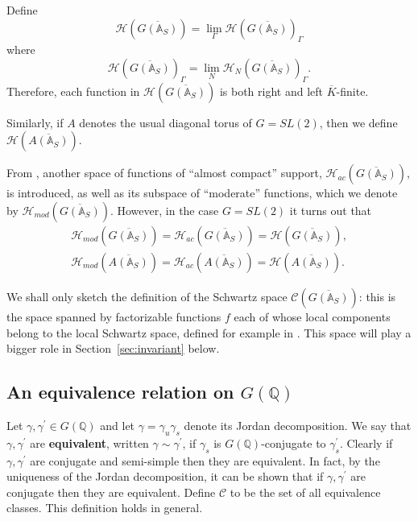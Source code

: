 Define
\[
{\mathcal{H}}(\overline{G({\mathbb{A}}_S)})=\lim_{\Gamma}
{\mathcal{H}}(\overline{G({\mathbb{A}}_S)})_\Gamma
\]
where
\[
{\mathcal{H}}(\overline{G({\mathbb{A}}_S)})_\Gamma =\lim_{N}
{\mathcal{H}}_N(\overline{G({\mathbb{A}}_S)})_\Gamma .
\]
Therefore, each function in
${\mathcal{H}}(\overline{G({\mathbb{A}}_S)})$
is both right and left $\overline{K}$-finite.

Similarly, if $A$ denotes the usual
diagonal torus of $G=SL(2)$, then we define
${\mathcal{H}}(\overline{A({\mathbb{A}}_S)})$.

From \cite[section 11]{A11}, another space of functions of
``almost compact'' support,
${\mathcal{H}}_{ac}(\overline{G({\mathbb{A}}_S)})$, is introduced,
as well as its subspace of ``moderate'' functions,
which we denote by
${\mathcal{H}}_{mod}(\overline{G({\mathbb{A}}_S)})$.
However, in the case $G=SL(2)$ it turns out that
\[
\begin{array}{c}
{\mathcal{H}}_{mod}(\overline{G({\mathbb{A}}_S)})=
{\mathcal{H}}_{ac}(\overline{G({\mathbb{A}}_S)})=
{\mathcal{H}}(\overline{G({\mathbb{A}}_S)}),\\  
{\mathcal{H}}_{mod}(\overline{A({\mathbb{A}}_S)})=
{\mathcal{H}}_{ac}(\overline{A({\mathbb{A}}_S)})=
{\mathcal{H}}(\overline{A({\mathbb{A}}_S)}).
\end{array}
\]

We shall only sketch the definition of the Schwartz
space ${\mathcal{C}}(\overline{G({\mathbb{A}}_S)})$: this is the space spanned by
factorizable functions $f$ each of whose local components
belong to the local Schwartz space, defined for example
in \cite{J1}.
This space will play a bigger role in Section~\ref{sec:invariant} below.

\subsection{An equivalence relation on $G({\mathbb{Q}})$}

Let $\gamma ,\gamma ^{\prime }\in G({\mathbb{Q}})$ and let
$\gamma =\gamma_u\gamma _s$ denote its Jordan decomposition.
We say that $\gamma ,\gamma^{\prime }$ are \textbf{equivalent},
written $\gamma \sim \gamma ^{\prime }$,
if $\gamma _s$ is $G({\mathbb{Q}})$-conjugate to
$\gamma _s^{\prime }$. Clearly
if $\gamma ,\gamma ^{\prime }$ are conjugate and
semi-simple then they are
equivalent. In fact, by the uniqueness of the Jordan decomposition, it can
be shown that if $\gamma ,\gamma ^{\prime }$ are conjugate then they are
equivalent. Define $\mathcal{C}$ to be the set of all equivalence classes.
This definition holds in general.

